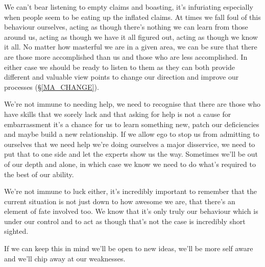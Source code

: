 \cleartorightpage
{\small

We can't bear listening to empty claims and boasting, it's infuriating especially when people seem to be eating up the inflated claims. At times we fall foul of this behaviour ourselves, acting as though there's nothing we can learn from those around us, acting as though we have it all figured out, acting as though we know it all. No matter how masterful we are in a given area, we can be sure that there are those more accomplished than us and those who are less accomplished. In either case we should be ready to listen to them as they can both provide different and valuable view points to change our direction and improve our processes (\S \ref{MA_CHANGE}).

We're not immune to needing help, we need to recognise that there are those who have skills that we sorely lack and that asking for help is not a cause for embarrassment it's a chance for us to learn something new, patch our deficiencies and maybe build a new relationship. If we allow ego to stop us from admitting to ourselves that we need help we're doing ourselves a major disservice, we need to put that to one side and let the experts show us the way. Sometimes we'll be out of our depth and alone, in which case we know we need to do what's required to the best of our ability.

We're not immune to luck either, it's incredibly important to remember that the current situation is not just down to how awesome we are, that there's an element of fate involved too. We know that it's only truly our behaviour which is under our control and to act as though that's not the case is incredibly short sighted.

If we can keep this in mind we'll be open to new ideas, we'll be more self aware and we'll chip away at our weaknesses.

}
\cleartoleftpage

